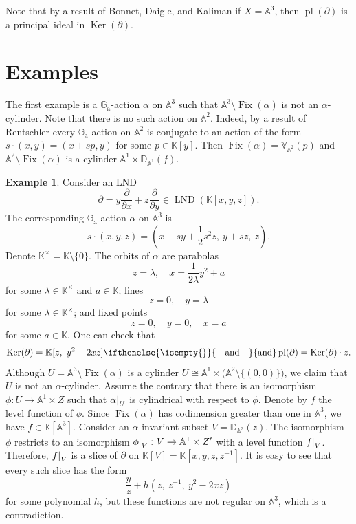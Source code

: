 \documentclass[a4paper, 12pt, reqno]{amsart}
\newcommand{\bb}{\mathbb}
\newcommand{\der}{\partial}
\newcommand{\Ga}{\bb{G}_\mathrm{a}}
\DeclareMathOperator{\Fix}{Fix}
\DeclareMathOperator{\Ker}{Ker}
\DeclareMathOperator{\LND}{LND}
\DeclareMathOperator{\pl}{pl}
\newcommand{\insertText}[2][]{%
    \ifthenelse{\isempty{#1}}{%
        \quad \text{#2} \quad%
    }{%
        #1 \text{#2} #1%
    }%
}
\newcommand{\restrict}[2]{
    \left.
    \kern-\nulldelimiterspace{#1}
    \right|_{#2}
}
\theoremstyle{definition}
\newtheorem{exam}[counter]{Example}
\theoremstyle{plain}
\begin{document}
Note that by a result of Bonnet, Daigle, and Kaliman \cite[Theorem~1.5]{DK09} if $X = \bb{A}^3$, then $\pl(\der)$ is a principal ideal in $\Ker(\der)$.


\section{Examples}


The first example is a $\Ga$-action $\alpha$ on $\bb{A}^3$ such that $\bb{A}^3 \setminus \Fix(\alpha)$ is not an $\alpha$-cylinder. Note that there is no such action on $\bb{A}^2$. Indeed, by a result of Rentschler \cite{Re68} every $\Ga$-action on $\bb{A}^2$ is conjugate to an action of the form $s \cdot (x, y) = (x + s p, y)$ for some $p \in \bb{K}[y]$. Then $\Fix(\alpha) = \bb{V}_{\bb{A}^2}(p)$ and $\bb{A}^2 \setminus \Fix(\alpha)$ is a cylinder $\bb{A}^1 \times \bb{D}_{\bb{A}^1}(f)$.

\begin{exam} \label{FP.ex}
Consider an LND
$$
\der = y \frac{\der}{\der x} + z \frac{\der}{\der y} \in
\LND(\bb{K}[x, y, z]).
$$
The corresponding $\Ga$-action $\alpha$ on $\bb{A}^3$ is
$$
s \cdot (x, y, z) =
\left( x + s y + \frac{1}{2} s^2 z, \ y + s z, \ z \right).
$$
Denote $\bb{K}^\times = \bb{K} \setminus \{0\}$. The orbits of $\alpha$ are parabolas
$$
z = \lambda, \quad
x = \frac{1}{2 \lambda} y^2 + a
$$
for some $\lambda \in \bb{K}^\times$ and $a \in \bb{K}$; lines
$$
z = 0, \quad y = \lambda
$$
for some $\lambda \in \bb{K}^\times$; and fixed points
$$
z = 0, \quad y = 0, \quad x = a
$$
for some $a \in \bb{K}$. One can check that
$$
\Ker(\der) = \bb{K}[z, \ y^2 - 2 x z]
\insertText{and}
\pl(\der) = \Ker(\der) \cdot z.
$$
Although $U = \bb{A}^3 \setminus \Fix(\alpha)$ is a cylinder $U \cong \bb{A}^1 \times \big( \bb{A}^2 \setminus \{(0, 0)\} \big)$, we claim that $U$ is not an $\alpha$-cylinder. Assume the contrary that there is an isomorphism $\phi \colon U \to \bb{A}^1 \times Z$ such that $\restrict{\alpha}{U}$ is cylindrical with respect to $\phi$. Denote by $f$ the level function of $\phi$. Since $\Fix(\alpha)$ has codimension greater than one in $\bb{A}^3$, we have $f \in \bb{K}[\bb{A}^3]$. Consider an $\alpha$-invariant subset $V = \bb{D}_{\bb{A}^3}(z)$. The isomorphism $\phi$ restricts to an isomorphism $\restrict{\phi}{V} \colon V \to \bb{A}^1 \times Z'$ with a level function $\restrict{f}{V}$. Therefore, $\restrict{f}{V}$ is a slice of $\der$ on $\bb{K}[V] = \bb{K}[x, y, z, z^{-1}]$. It is easy to see that every such slice has the form
$$
\frac{y}{z} + h(z, \ z^{-1}, \ y^2 - 2 x z)
$$
for some polynomial $h$, but these functions are not regular on $\bb{A}^3$, which is a contradiction.
\end{exam}
\end{document}
